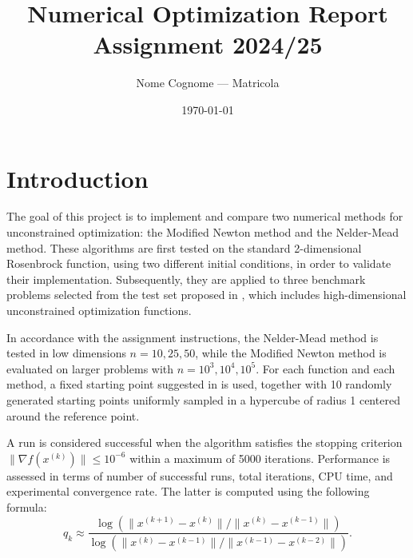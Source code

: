 \documentclass[a4paper,12pt]{article}
\begin{document}
	
	\title{\textbf{Numerical Optimization Report}\\
		\vspace{0.5em}\large Assignment 2024/25}
	\author{Nome Cognome — Matricola}
	\date{\today}
	\maketitle
	\thispagestyle{empty}   %
	\newpage                %
	
	\tableofcontents
	\newpage                %
	
	
	\section{Introduction}
	
	The goal of this project is to implement and compare two numerical methods for unconstrained optimization: the Modified Newton method and the Nelder-Mead method. These algorithms are first tested on the standard 2-dimensional Rosenbrock function, using two different initial conditions, in order to validate their implementation. Subsequently, they are applied to three benchmark problems selected from the test set proposed in \cite{luksan1999}, which includes high-dimensional unconstrained optimization functions.
	
	In accordance with the assignment instructions, the Nelder-Mead method is tested in low dimensions \( n = 10, 25, 50 \), while the Modified Newton method is evaluated on larger problems with \( n = 10^3, 10^4, 10^5 \). For each function and each method, a fixed starting point suggested in \cite{luksan1999} is used, together with 10 randomly generated starting points uniformly sampled in a hypercube of radius 1 centered around the reference point.
	
	A run is considered successful when the algorithm satisfies the stopping criterion \( \|\nabla f(x^{(k)})\| \leq 10^{-6} \) within a maximum of 5000 iterations. Performance is assessed in terms of number of successful runs, total iterations, CPU time, and experimental convergence rate. The latter is computed using the following formula:
	\[
	q_k \approx \frac{\log\left(\|x^{(k+1)} - x^{(k)}\|\big/\|x^{(k)} - x^{(k-1)}\|\right)}{\log\left(\|x^{(k)} - x^{(k-1)}\|\big/\|x^{(k-1)} - x^{(k-2)}\|\right)}.
	\]
	
\end{document}
